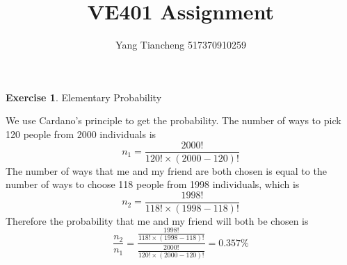 \documentclass[12pt,a4paper]{article}
\makeatletter
\theoremstyle{definition}
\newtheorem{exercise}{Exercise}
\newtheorem*{solution}{Solution}
\renewenvironment{solution}[1][Solution] {\par\pushQED{\qed}\normalfont\topsep6\p@\@plus6\p@\relax\trivlist\item[\hskip\labelsep\bfseries#1\@addpunct{.}]\ignorespaces}{\popQED\endtrivlist\@endpefalse} \makeatother
\makeatother
\begin{document}
\title{VE401 Assignment}
\author{Yang Tiancheng 517370910259}
\maketitle

\newpage

\begin{exercise}
Elementary Probability
\begin{solution}
We use Cardano's principle to get the probability. The number of ways to pick 120 people from 2000 individuals is
$$n_1=\frac{2000!}{120!\times(2000-120)!}$$
The number of ways that me and my friend are both chosen is equal to the number of ways to choose 118 people from 1998 individuals, which is
$$n_2=\frac{1998!}{118!\times(1998-118)!}$$
Therefore the probability that me and my friend will both be chosen is
$$\frac{n_2}{n_1}=\frac{\frac{1998!}{118!\times(1998-118)!}}{\frac{2000!}{120!\times(2000-120)!}}=0.357\%$$
\end{solution}
\end{exercise}
\end{document}

